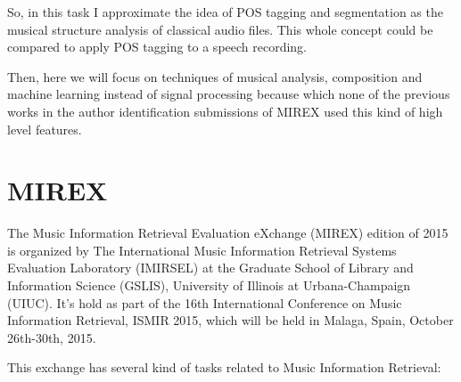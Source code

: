 \documentclass[a4paper,openany,oneside,12pt]{book}
\begin{document}
So, in this task I approximate the idea of POS tagging and segmentation as the musical structure analysis of classical audio files. This whole concept could be compared to apply POS tagging to a speech recording.

Then, here we will focus on techniques of musical analysis, composition and machine learning instead of signal processing  because which none of the previous works in the author identification submissions of MIREX used this kind of high level features.

\section{MIREX}
The Music Information Retrieval Evaluation eXchange (MIREX) edition of 2015 is organized by The International Music Information Retrieval Systems Evaluation Laboratory (IMIRSEL) at the Graduate School of Library and Information Science (GSLIS), University of Illinois at Urbana-Champaign (UIUC). It's hold as part of the 16th International Conference on Music Information Retrieval, ISMIR 2015, which will be held in Malaga, Spain, October 26th-30th, 2015.

This exchange has several kind of tasks related to Music Information Retrieval:
\end{document}

